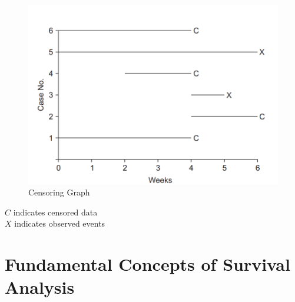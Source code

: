 \documentclass[doublespacing,12pt]{report}
\begin{document}
\begin{figure}[H]
    \centering
    \includegraphics[width=1\linewidth]{Figure 3/3.2.png}
    \caption{Censoring Graph}
    \label{Figure 3.2}
\end{figure}



\vspace{0.1in}
 \noindent \(C\) indicates censored data
\\ \noindent  \(X\) indicates observed events






\section{Fundamental Concepts of Survival Analysis}
\end{document}
